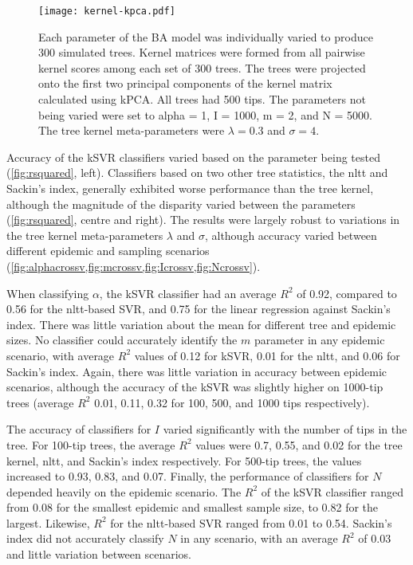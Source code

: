 \begin{figure}[ht]
  \centering
  \texttt{[image: kernel-kpca.pdf]}
  \caption[Kernel-PCA projections of simulated trees under varying BA
           parameter values.]{
    Each parameter of the \gls{BA} model was individually varied to produce 300
    simulated trees. Kernel matrices were formed from all pairwise kernel
    scores among each set of 300 trees. The trees were projected onto the first
    two principal components of the kernel matrix calculated using \gls{kPCA}.
    All trees had 500 tips. The parameters not being varied were set to
    \gls{alpha} = 1, \gls{I} = 1000, \gls{m} = 2, and \gls{N} = 5000. The tree
    kernel meta-parameters were $\lambda = 0.3$ and $\sigma = 4$.
  }
  \label{fig:kpca}
\end{figure}



Accuracy of the \gls{kSVR} classifiers varied based on the parameter being
tested (\cref{fig:rsquared}, left). Classifiers based on two other tree
statistics, the \gls{nltt} and Sackin's index, generally exhibited worse
performance than the tree kernel, although the magnitude of the disparity
varied between the parameters (\cref{fig:rsquared}, centre and right). The
results were largely robust to variations in the tree kernel meta-parameters
$\lambda$ and $\sigma$, although accuracy varied between different epidemic and
sampling scenarios
(\cref{fig:alphacrossv,fig:mcrossv,fig:Icrossv,fig:Ncrossv}).

When classifying $\alpha$, the \gls{kSVR} classifier had an average $R^2$ of 
    0.92,
compared to 
    0.56
for the \gls{nltt}-based SVR, and
    0.75
for the linear regression against Sackin's index. There was little variation
about the mean for different tree and epidemic sizes. No classifier could
accurately identify the $m$ parameter in any epidemic scenario, with average
$R^2$ values of 
  0.12 for \gls{kSVR},
  0.01 for the \gls{nltt}, and
  0.06
for Sackin's index. Again, there was little variation in accuracy between
epidemic scenarios, although the accuracy of the \gls{kSVR} was slightly higher
on 1000-tip trees 
    (average $R^2$ 
     0.01,
     0.11,
     0.32
     for 100, 500, and 1000 tips respectively).

The accuracy of classifiers for $I$ varied significantly with the number of
tips in the tree. For 100-tip trees, the average $R^2$ values were
  0.7,
  0.55, and
  0.02
for the tree kernel, \gls{nltt}, and Sackin's index respectively. For 500-tip
trees, the values increased to
  0.93,
  0.83, and
  0.07.
Finally, the performance of classifiers for $N$ depended heavily on the
epidemic scenario. The $R^2$ of the \gls{kSVR} classifier ranged from
  0.08
for the smallest epidemic and smallest sample size, to
  0.82
for the largest. Likewise, $R^2$ for the \gls{nltt}-based SVR ranged from 
  0.01
to
  0.54.
Sackin's index did not accurately classify $N$ in any scenario, with an average
$R^2$ of
  0.03
and little variation between scenarios.

